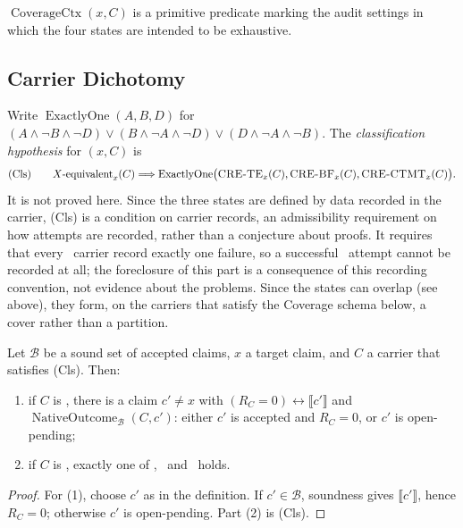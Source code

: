 \begin{definition}\label{def:coverage-ctx}
\(\operatorname{CoverageCtx}(x,C)\) is a primitive predicate marking the
audit settings in which the four states are intended to be exhaustive.
\end{definition}

\subsection{Carrier Dichotomy}\label{sec:foreclosure:carrier-dichotomy}

Write \(\operatorname{ExactlyOne}(A,B,D)\) for
\((A\wedge\neg B\wedge\neg D)\vee(B\wedge\neg A\wedge\neg D)\vee(D\wedge\neg A\wedge\neg B)\).
The \emph{classification hypothesis} for \((x,C)\) is
\[
  \mbox{(Cls)}\qquad
  \mbox{$X$-equivalent}_{x}(C)\Longrightarrow
  \operatorname{ExactlyOne}\bigl(\mbox{\textup{\textsc{CRE-TE}}}_{x}(C),\mbox{\textup{\textsc{CRE-BF}}}_{x}(C),\mbox{\textup{\textsc{CRE-CTMT}}}_{x}(C)\bigr).
\]
It is not proved here.  Since the three states are defined by data
recorded in the carrier, (Cls) is a condition on carrier records, an
admissibility requirement on how attempts are recorded, rather than a conjecture about proofs.  It requires that every \Xequiv\ carrier
record exactly one failure, so a successful \Xequiv\ attempt cannot be
recorded at all; the foreclosure of this part is a consequence of this
recording convention, not evidence about the problems.  Since the
states can overlap (see above), they form, on the carriers that satisfy
the Coverage schema below, a cover rather than a partition.

\begin{theorem}\label{thm:carrier-dichotomy}
Let \(\mathcal B\) be a sound set of accepted claims, \(x\) a target
claim, and \(C\) a carrier that satisfies \textup{(Cls)}.  Then:
\begin{enumerate}
\item if \(C\) is \nonXequiv, there is a claim \(c'\neq x\) with
  \((R_{C}=0)\leftrightarrow\llbracket c'\rrbracket\) and
  \(\operatorname{NativeOutcome}_{\mathcal B}(C,c')\): either \(c'\) is
  accepted and \(R_{C}=0\), or \(c'\) is open-pending;
\item if \(C\) is \Xequiv, exactly one of \CRETE, \CREBF\ and
  \CRECTMT\ holds.
\end{enumerate}
\end{theorem}

\begin{proof}
For (1), choose \(c'\) as in the definition.  If \(c'\in\mathcal B\),
soundness gives \(\llbracket c'\rrbracket\), hence \(R_{C}=0\); otherwise
\(c'\) is open-pending.  Part (2) is (Cls).
\end{proof}

